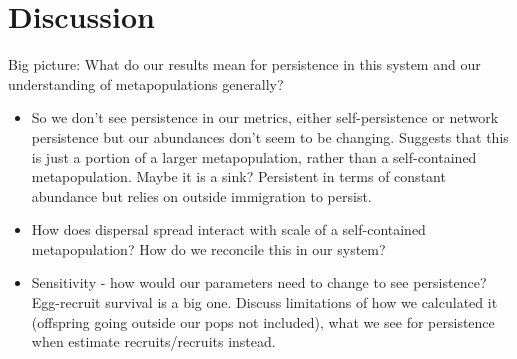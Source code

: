 \documentclass[12pt, oneside]{article}   	%
\begin{document}
\section*{Discussion}
Big picture: What do our results mean for persistence in this system and our understanding of metapopulations generally?
\begin{itemize}
	\item So we don't see persistence in our metrics, either self-persistence or network persistence but our abundances don't seem to be changing. Suggests that this is just a portion of a larger metapopulation, rather than a self-contained metapopulation. Maybe it is a sink? Persistent in terms of constant abundance but relies on outside immigration to persist.
	\item How does dispersal spread interact with scale of a self-contained metapopulation? How do we reconcile this in our system?
	\item Sensitivity - how would our parameters need to change to see persistence? Egg-recruit survival is a big one. Discuss limitations of how we calculated it (offspring going outside our pops not included), what we see for persistence when estimate recruits/recruits instead.
\end{itemize}
\end{document}
